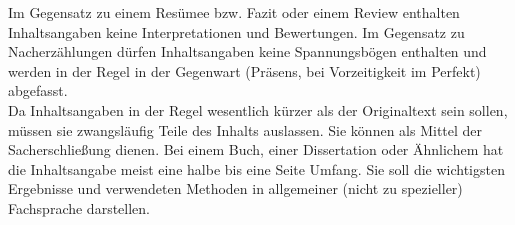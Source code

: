 Im Gegensatz zu einem Resümee bzw. Fazit oder einem Review enthalten Inhaltsangaben keine Interpretationen und Bewertungen. Im Gegensatz zu Nacherzählungen dürfen Inhaltsangaben keine Spannungsbögen enthalten und werden in der Regel in der Gegenwart (Präsens, bei Vorzeitigkeit im Perfekt) abgefasst.\\

Da Inhaltsangaben in der Regel wesentlich kürzer als der Originaltext sein sollen, müssen sie zwangsläufig Teile des Inhalts auslassen. Sie können als Mittel der Sacherschließung dienen. Bei einem Buch, einer Dissertation oder Ähnlichem hat die Inhaltsangabe meist eine halbe bis eine Seite Umfang. Sie soll die wichtigsten Ergebnisse und verwendeten Methoden in allgemeiner (nicht zu spezieller) Fachsprache darstellen.
